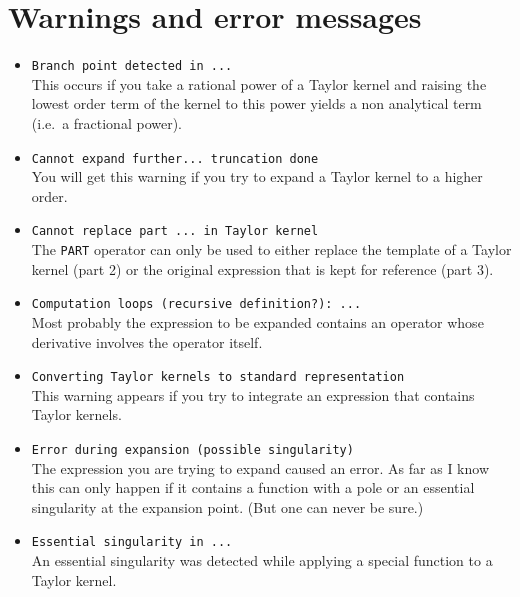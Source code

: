 \section{Warnings and error messages}
\begin{itemize}

\item \verb|Branch point detected in ...|\\
    This occurs if you take a rational power of a Taylor kernel
    and raising the lowest order term of the kernel to this
    power yields a non analytical term (i.e.\ a fractional power).

\item \verb|Cannot expand further... truncation done|\\
    You will get this warning if you try to expand a Taylor kernel to
    a higher order.

\item \verb|Cannot replace part ... in Taylor kernel|\\
    The \verb|PART| operator can only be used to either replace the
    template of a Taylor kernel (part 2) or the original expression
    that is kept for reference (part 3).    

\item \verb|Computation loops (recursive definition?): ...|\\
    Most probably the expression to be expanded contains an operator
    whose derivative involves the operator itself.

\item \verb|Converting Taylor kernels to standard representation|\\
    This warning appears if you try to integrate an expression that
    contains Taylor kernels.

\item \verb|Error during expansion (possible singularity)|\\
    The expression you are trying to expand caused an error.
    As far as I know this can only happen if it contains a function
    with a pole or an essential singularity at the expansion point.
    (But one can never be sure.)

\item \verb|Essential singularity in ...|\\
    An essential singularity was detected while applying a
    special function to a Taylor kernel.


\end{itemize}
